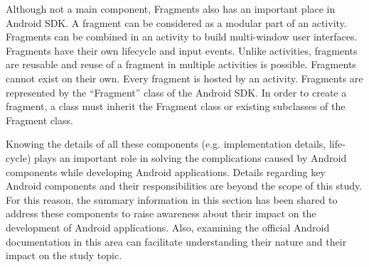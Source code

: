 Although not a main component, Fragments also has an important place in Android SDK. A fragment can be considered as a modular part of an activity. Fragments can be combined in an activity to build multi-window user interfaces. Fragments have their own lifecycle and input events. Unlike activities, fragments are reusable and reuse of a fragment in multiple activities is possible. Fragments cannot exist on their own. Every fragment is hosted by an activity. Fragments are represented by the “Fragment” class of the Android SDK. In order to create a fragment, a class must inherit the Fragment class or existing subclasses of the Fragment class.

Knowing the details of all these components (e.g. implementation details, life-cycle) plays an important role in solving the complications caused by Android components while developing Android applications. Details regarding key Android components and their responsibilities are beyond the scope of this study. For this reason, the summary information in this section has been shared to address these components to raise awareness about their impact on the development of Android applications. Also, examining the official Android documentation in this area can facilitate understanding their nature and their impact on the study topic.